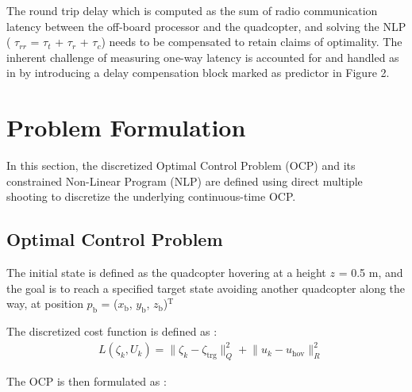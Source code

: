 \documentclass[conference]{IEEEtran}
\begin{document}
The round trip delay which is computed as the sum of radio communication latency between the off-board processor and the quadcopter, and solving the NLP ( $\tau_{rr}$ = $\tau_{t}$ + $\tau_{r}$ + $\tau_{c}$) needs to be compensated to retain claims of optimality. The inherent challenge of measuring one-way latency is accounted for and handled as in \cite{carlos_efficient_2020} by introducing a delay compensation block marked as predictor in Figure 2.

\section{Problem Formulation}\label{Section3}

In this section, the discretized Optimal Control Problem (OCP) and its constrained Non-Linear Program (NLP) are defined using direct multiple shooting \cite{bock_multiple_1984} to discretize the underlying continuous-time OCP.

\subsection{Optimal Control Problem}

The initial state is defined as the quadcopter hovering at a height $z$ = 0.5 m, and the goal is to reach a specified target state avoiding another quadcopter along the way, at position  $p_\mathrm{b}$ = ($x_\mathrm{b}$, $y_\mathrm{b}$, $z_\mathrm{b}$)$\mathrm{^{T}}$

The discretized cost function is defined as :
\begin{align}
	& L\left(\zeta_k, U_k\right) = \lVert \zeta_k - \zeta_{\mathrm{trg}} \rVert^2_Q + \lVert u_k - u_{\mathrm{hov}} \rVert^2_R
\end{align}

The OCP is then formulated as :
\end{document}

